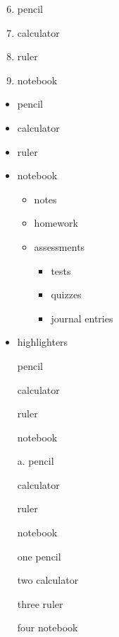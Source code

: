 \documentclass[11pt]{article}
\begin{document}
\pagebreak

\begin{enumerate} \setcounter{enumi}{5}
\item pencil
\item calculator
\item ruler
\item notebook
\end{enumerate}

\vspace{1cm}

\begin{itemize}
\item pencil
\item calculator
\item ruler
\item notebook
    \begin{itemize}
    \item notes
    \item homework
    \item assessments
        \begin{itemize}
        \item tests
        \item quizzes
        \item journal entries
        \end{itemize}
    \end{itemize}
\item highlighters
\end{itemize}

\vspace{1cm}

\begin{enumerate}
\item[] pencil
\item[] calculator
\item[] ruler
\item[] notebook
\end{enumerate}

\pagebreak

\begin{enumerate}
\item[a.] pencil
\item[] calculator
\item[] ruler
\item[] notebook
\end{enumerate}

\vspace{1cm}

\begin{enumerate}
\item[one] pencil
\item[two] calculator
\item[three] ruler
\item[four] notebook
\end{enumerate}
\end{document}
